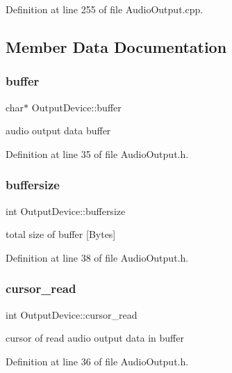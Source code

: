 Definition at line 255 of file Audio\+Output.\+cpp.



\subsection{Member Data Documentation}
\mbox{\label{class_output_device_adf56f9d3e97d766a2e2b04c7bc743ee2}} 
\subsubsection{\texorpdfstring{buffer}{buffer}}
{\footnotesize\ttfamily char$\ast$ Output\+Device\+::buffer}

audio output data buffer 

Definition at line 35 of file Audio\+Output.\+h.

\mbox{\label{class_output_device_a04e2fe4f9b7a15bf6993144d49f29461}} 
\subsubsection{\texorpdfstring{buffersize}{buffersize}}
{\footnotesize\ttfamily int Output\+Device\+::buffersize}

total size of buffer \mbox{[}Bytes\mbox{]} 

Definition at line 38 of file Audio\+Output.\+h.

\mbox{\label{class_output_device_ab49ebf067d9b6f15f2305d5028cde85e}} 
\subsubsection{\texorpdfstring{cursor\+\_\+read}{cursor\_read}}
{\footnotesize\ttfamily int Output\+Device\+::cursor\+\_\+read}

cursor of read audio output data in buffer 

Definition at line 36 of file Audio\+Output.\+h.

\mbox{\label{class_output_device_ad770c7e5e833ccd9030382e16691f331}} 
